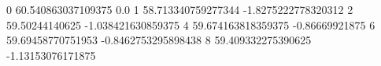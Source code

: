 0 60.540863037109375 0.0
1 58.713340759277344 -1.8275222778320312
2 59.50244140625 -1.038421630859375
4 59.674163818359375 -0.86669921875
6 59.69458770751953 -0.8462753295898438
8 59.409332275390625 -1.13153076171875
